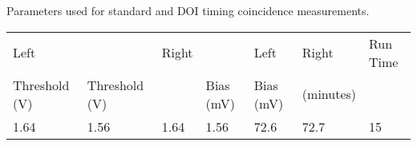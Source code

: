 \caption{\label{tab:optimumparam} Parameters used for standard and DOI timing coincidence measurements.} 
\begin{table}
\begin{tabular}{lllllll}
\hline
Left & & Right & & Left & Right & Run Time\\
Threshold (V) & Threshold (V)& & Bias (mV) & Bias (mV) & (minutes)\\
\hline
1.64&  1.56 &  1.64 &  1.56 &  72.6 &  72.7 & 15\\
\hline
\end{tabular}
\end{table}

